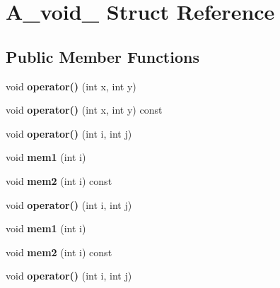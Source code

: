 \hypertarget{struct_a__void__2}{}\section{A\+\_\+void\+\_ Struct Reference}
\label{struct_a__void__2}
\subsection*{Public Member Functions}
\begin{DoxyCompactItemize}
\item 
\mbox{\label{struct_a__void__2_a16adbb3c5de5ea6b687ec19ebd55b3bd}} 
void {\bfseries operator()} (int x, int y)
\item 
\mbox{\label{struct_a__void__2_a246391c2fe8258feaabcd25f658803f3}} 
void {\bfseries operator()} (int x, int y) const
\item 
\mbox{\label{struct_a__void__2_a0cacba004197ab4fc207314ee5dce531}} 
void {\bfseries operator()} (int i, int j)
\item 
\mbox{\label{struct_a__void__2_a38d83f9a54083c0fc3dd27fe1648a783}} 
void {\bfseries mem1} (int i)
\item 
\mbox{\label{struct_a__void__2_a0df8fe8b4e446556c20ca71b7ffb38e7}} 
void {\bfseries mem2} (int i) const
\item 
\mbox{\label{struct_a__void__2_a0cacba004197ab4fc207314ee5dce531}} 
void {\bfseries operator()} (int i, int j)
\item 
\mbox{\label{struct_a__void__2_a38d83f9a54083c0fc3dd27fe1648a783}} 
void {\bfseries mem1} (int i)
\item 
\mbox{\label{struct_a__void__2_a0df8fe8b4e446556c20ca71b7ffb38e7}} 
void {\bfseries mem2} (int i) const
\item 
\mbox{\label{struct_a__void__2_a0cacba004197ab4fc207314ee5dce531}} 
void {\bfseries operator()} (int i, int j)
\item 
\mbox{\label{struct_a__void__2_a38d83f9a54083c0fc3dd27fe1648a783}} 

\end{DoxyCompactItemize}
